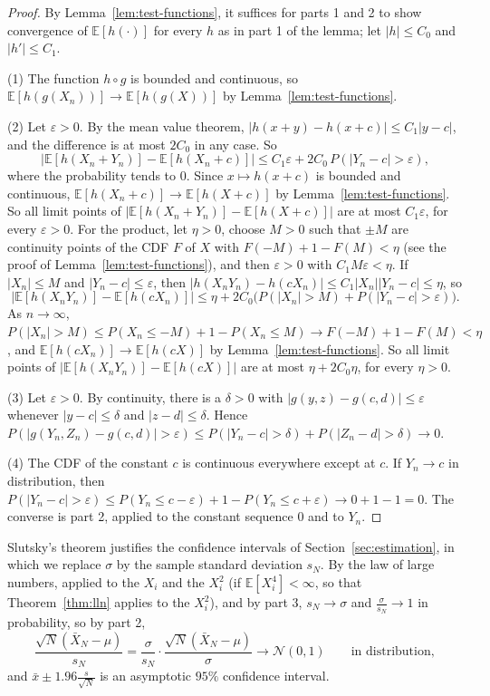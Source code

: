 \documentclass[11pt]{article}
\newcommand{\E}{\mathbb{E}}
\theoremstyle{definition}
\theoremstyle{plain}
\theoremstyle{remark}
\begin{document}
\begin{proof}
    By Lemma~\ref{lem:test-functions}, it suffices for parts 1 and 2 to show convergence of $\E[h(\cdot)]$ for every $h$ as in part 1 of the lemma; let $|h| \leq C_0$ and $|h'| \leq C_1$.

    (1) The function $h \circ g$ is bounded and continuous, so $\E[h(g(X_n))] \to \E[h(g(X))]$ by Lemma~\ref{lem:test-functions}.

    (2) Let $\varepsilon > 0$. By the mean value theorem, $|h(x + y) - h(x + c)| \leq C_1|y - c|$, and the difference is at most $2C_0$ in any case. So
    \[\big|\E[h(X_n + Y_n)] - \E[h(X_n + c)]\big| \leq C_1\varepsilon + 2C_0\,P(|Y_n - c| > \varepsilon),\]
    where the probability tends to $0$. Since $x \mapsto h(x + c)$ is bounded and continuous, $\E[h(X_n + c)] \to \E[h(X + c)]$ by Lemma~\ref{lem:test-functions}. So all limit points of $\big|\E[h(X_n + Y_n)] - \E[h(X + c)]\big|$ are at most $C_1\varepsilon$, for every $\varepsilon > 0$. For the product, let $\eta > 0$, choose $M > 0$ such that $\pm M$ are continuity points of the CDF $F$ of $X$ with $F(-M) + 1 - F(M) < \eta$ (see the proof of Lemma~\ref{lem:test-functions}), and then $\varepsilon > 0$ with $C_1M\varepsilon < \eta$. If $|X_n| \leq M$ and $|Y_n - c| \leq \varepsilon$, then $|h(X_nY_n) - h(cX_n)| \leq C_1|X_n||Y_n - c| \leq \eta$, so
    \[\big|\E[h(X_nY_n)] - \E[h(cX_n)]\big| \leq \eta + 2C_0\big(P(|X_n| > M) + P(|Y_n - c| > \varepsilon)\big).\]
    As $n \to \infty$, $P(|X_n| > M) \leq P(X_n \leq -M) + 1 - P(X_n \leq M) \to F(-M) + 1 - F(M) < \eta$, and $\E[h(cX_n)] \to \E[h(cX)]$ by Lemma~\ref{lem:test-functions}. So all limit points of $\big|\E[h(X_nY_n)] - \E[h(cX)]\big|$ are at most $\eta + 2C_0\eta$, for every $\eta > 0$.

    (3) Let $\varepsilon > 0$. By continuity, there is a $\delta > 0$ with $|g(y, z) - g(c, d)| \leq \varepsilon$ whenever $|y - c| \leq \delta$ and $|z - d| \leq \delta$. Hence $P(|g(Y_n, Z_n) - g(c, d)| > \varepsilon) \leq P(|Y_n - c| > \delta) + P(|Z_n - d| > \delta) \to 0$.

    (4) The CDF of the constant $c$ is continuous everywhere except at $c$. If $Y_n \to c$ in distribution, then $P(|Y_n - c| > \varepsilon) \leq P(Y_n \leq c - \varepsilon) + 1 - P(Y_n \leq c + \varepsilon) \to 0 + 1 - 1 = 0$. The converse is part 2, applied to the constant sequence $0$ and to $Y_n$.
\end{proof}

Slutsky's theorem justifies the confidence intervals of Section~\ref{sec:estimation}, in which we replace $\sigma$ by the sample standard deviation $s_N$. By the law of large numbers, applied to the $X_i$ and the $X_i^2$ (if $\E[X_i^4] < \infty$, so that Theorem~\ref{thm:lln} applies to the $X_i^2$), and by part 3, $s_N \to \sigma$ and $\frac{\sigma}{s_N} \to 1$ in probability, so by part 2,
\[\frac{\sqrt{N}(\bar X_N - \mu)}{s_N} = \frac{\sigma}{s_N} \cdot \frac{\sqrt{N}(\bar X_N - \mu)}{\sigma} \to \mathcal{N}(0, 1) \qquad \text{in distribution},\]
and $\bar x \pm 1.96\frac{s}{\sqrt{N}}$ is an asymptotic $95\%$ confidence interval.
\end{document}
